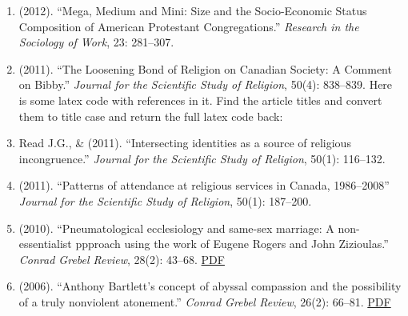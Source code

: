 \begin{enumerate}
\item \Eagle \hspace{.01em} (2012). ``Mega, Medium and Mini: Size and the Socio-Economic Status Composition of American Protestant Congregations.'' \emph{Research in the Sociology of Work}, 23: 281--307. 

\item \Eagle \hspace{.01em} (2011). ``The Loosening Bond of Religion on Canadian Society: A Comment on Bibby.'' \emph{Journal for the Scientific Study of Religion}, 50(4): 838--839.
Here is some latex code with references in it. Find the article titles and convert them to title case and return the full latex code back:

\item Read J.G., \& \Eagle \hspace{.01em} (2011). ``Intersecting identities as a source of religious incongruence.''  \emph{Journal for the Scientific Study of Religion}, 50(1): 116--132. 

\item \Eagle \hspace{.01em} (2011). ``Patterns of attendance at religious services in Canada, 1986--2008'' \emph{Journal for the Scientific Study of Religion}, 50(1): 187--200. 

\item \Eagle \hspace{.01em} (2010). ``Pneumatological ecclesiology and same-sex marriage: A non-essentialist ppproach using the work of Eugene Rogers and John Zizioulas.'' \emph{Conrad Grebel Review}, 28(2): 43--68. \href{https://www.davideagle.org/publication/eagle-pneumatological-ecclesiology-samesex-2010/eagle-pneumatological-ecclesiology-samesex-2010.pdf}{PDF}

\item \Eagle\hspace{.01em} (2006). ``Anthony Bartlett's concept of abyssal compassion and the possibility of a truly nonviolent atonement.'' \emph{Conrad Grebel Review}, 26(2): 66--81. \href{https://www.davideagle.org/publication/eagle-anthony-bartlett-concept-2006/eagle-anthony-bartlett-concept-2006.pdf}{PDF}

\end{enumerate}

